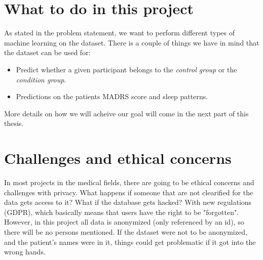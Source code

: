 \section{What to do in this project}
As stated in the problem statement, we want to perform different types of machine learning on the dataset. 
There is a couple of things we have in mind that the dataset can be used for:

\begin{itemize}
    \item Predict whether a given participant belongs to the \textit{control group} or the \textit{condition group}.
    \item Predictions on the patients MADRS score and sleep patterns.
\end{itemize}

More details on how we will acheive our goal will come in the next part of this thesis.

\section{Challenges and ethical concerns}
In most projects in the medical fields, there are going to be ethical concerns and challenges with privacy. What happens if someone that are not clearified for 
the data gets access to it? What if the database gets hacked? With new regulations (GDPR), which basically means that users have the right to be "forgotten". 
However, in this project all data is anonymized (only referenced by an id), so there will be no persons mentioned. If the dataset were not to be anonymized, 
and the patient's names were in it, things could get problematic if it got into the wrong hands. 



